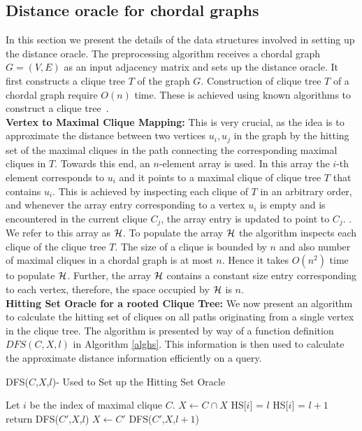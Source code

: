 \documentclass[MS,synopsis]{iitmdiss}
\begin{document}
 \subsection{Distance oracle for chordal graphs}\label{preprocessing}
 In this section we present the details of the data structures involved in setting up the distance oracle.  
 The preprocessing algorithm receives a chordal graph $G = (V,E)$ as an input adjacency matrix and sets up the distance oracle.
 It first constructs a clique tree $T$ of the graph  $G$. Construction of clique tree $T$ of a chordal graph require $O(n)$ time.
 These is achieved using known algorithms  to construct a clique tree~\cite{golumbic}. \\  
 {\bf Vertex to Maximal Clique Mapping:}  This is very crucial, as the idea is to approximate the distance between two vertices $u_i,u_j$
 in the graph by the hitting set of the maximal cliques in the path connecting the corresponding maximal cliques in $T$. 
 Towards this end, an $n$-element array is used. In this array the $i$-th element corresponds to $u_i$ and it points to a maximal 
 clique of clique tree $T$ that contains $u_i$.   This is achieved by inspecting each clique of $T$ in an arbitrary order, 
 and whenever the array entry corresponding to a vertex $u_i$ is empty and is encountered in the current clique $C_j$, 
 the array entry is updated to point to $C_j$.  . 
 We refer to this array as ${\cal H}$.  To populate the array ${\cal H}$ the algorithm inspects each clique of the clique tree  $T$. 
 The size of a clique is bounded by $n$ and also number of maximal cliques in a chordal graph is at most $n$. Hence it takes $O(n^2)$ time to populate ${\cal H}$. 
 Further, the array ${\cal H}$ contains a constant size entry corresponding to each vertex, therefore, the space occupied by ${\cal H}$ is $n$.\\
 {\bf Hitting Set Oracle for a rooted Clique Tree:}  We now present an algorithm to calculate the hitting set of cliques on all 
 paths originating from a single vertex in the clique tree.   The algorithm is presented by way of a function definition $DFS(C,X,l)$ in Algorithm \ref{alghs}.
 This information is then used to calculate the approximate distance information efficiently on a query.
\begin{algorithm}[] 
  \caption{DFS($C$,$X$,$l$)- Used to Set up the Hitting Set Oracle}
  \label{alghs}
  \begin{algorithmic}[1]
  \STATE Let $i$ be the index of maximal clique $C$.
  \STATE $X \leftarrow C \cap X$
    \STATE HS[$i$] = $l$
  \ELSE 
    \STATE HS[$i$] = $l+1$
  \ENDIF
    \STATE return
  \ELSE
    \STATE  {}
	\STATE DFS($C'$,$X$,$l$)
      \ELSE
	\STATE $X \leftarrow C'$
	\STATE DFS($C'$,$X$,$l+1$)
       \ENDIF
     \ENDFOR
  \ENDIF
  \end{algorithmic}
 \end{algorithm}
\end{document}
